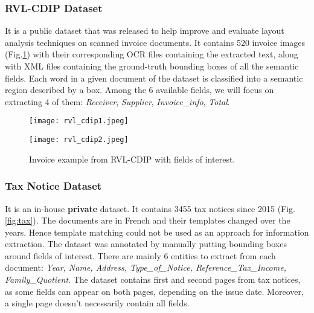 \documentclass[conference]{IEEEtran}
\begin{document}
\subsubsection{ \textbf{RVL-CDIP Dataset \cite{rvl}}} 
It is a public dataset that was released to help improve and evaluate layout analysis techniques on scanned invoice documents. It contains 520 invoice images (Fig.\ref{fig:rvl-cdip}) with their corresponding OCR files containing the extracted text, along with  XML files containing the ground-truth bounding boxes of all the semantic fields. Each word in a given document of the dataset is classified into a semantic region described by a box. Among the 6 available fields, we will focus on extracting 4 of them: \textit{Receiver}, \textit{Supplier}, \textit{Invoice\_info}, \textit{Total}.
\newline

\begin{figure}[!h]
\begin{minipage}[t]{0.48\linewidth}
    \centering
    \texttt{[image: rvl\_cdip1.jpeg]}
    \label{f31}
\end{minipage}
\hspace{0.1cm}
\begin{minipage}[t]{0.48\linewidth} 
    \centering
    \texttt{[image: rvl\_cdip2.jpeg]}
    \label{f32}
\end{minipage}        
    \caption{Invoice example from RVL-CDIP with fields of interest.}
\label{fig:rvl-cdip}
\end{figure}  




\subsubsection{\textbf{Tax Notice Dataset}}
It is an in-house \textbf{private} dataset. It contains 3455 tax notices since 2015 (Fig.\ref{fig:tax}). The documents are in French and their templates changed over the years. 
Hence template matching could not be used as an approach for information extraction. The dataset was annotated by manually putting bounding boxes around fields of interest. There are mainly 6 entities to extract from each document: \textit{Year, Name, Address, Type\_of\_Notice, Reference\_Tax\_Income, Family\_Quotient}.
The dataset contains first and second pages from tax notices, as some fields can appear on both pages, depending on the issue date. Moreover, a single page doesn't necessarily contain all fields.  
\end{document}
